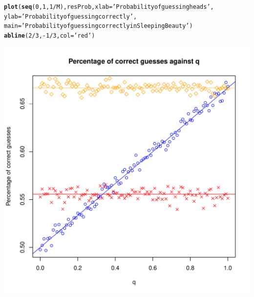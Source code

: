\documentclass{article}\usepackage[]{graphicx}\usepackage[]{color}
\makeatletter
\def\maxwidth{ %
  \ifdim\Gin@nat@width>\linewidth
    \linewidth
  \else
    \Gin@nat@width
  \fi
}
\newcommand{\hlnum}[1]{\textcolor[rgb]{0.686,0.059,0.569}{#1}}%
\newcommand{\hlstr}[1]{\textcolor[rgb]{0.192,0.494,0.8}{#1}}%
\newcommand{\hlopt}[1]{\textcolor[rgb]{0,0,0}{#1}}%
\newcommand{\hlstd}[1]{\textcolor[rgb]{0.345,0.345,0.345}{#1}}%
\newcommand{\hlkwc}[1]{\textcolor[rgb]{0.333,0.667,0.333}{#1}}%
\newcommand{\hlkwd}[1]{\textcolor[rgb]{0.737,0.353,0.396}{\textbf{#1}}}%
\newenvironment{kframe}{%
 \def\at@end@of@kframe{}%
 \ifinner\ifhmode%
  \def\at@end@of@kframe{\end{minipage}}%
  \begin{minipage}{\columnwidth}%
 \fi\fi%
 \def\FrameCommand##1{\hskip\@totalleftmargin \hskip-\fboxsep
 \colorbox{shadecolor}{##1}\hskip-\fboxsep
     \hskip-\linewidth \hskip-\@totalleftmargin \hskip\columnwidth}%
 \MakeFramed {\advance\hsize-\width
   \@totalleftmargin\z@ \linewidth\hsize
   \@setminipage}}%
 {\par\unskip\endMakeFramed%
 \at@end@of@kframe}
\newenvironment{knitrout}{}{} %
\makeatother
\begin{document}
\begin{knitrout}
\begin{kframe}
\begin{alltt}
\hlkwd{plot}\hlstd{(}\hlkwd{seq}\hlstd{(}\hlnum{0}\hlstd{,}\hlnum{1}\hlstd{,}\hlnum{1}\hlopt{/}\hlstd{M), resProb,} \hlkwc{xlab}\hlstd{=}\hlstr{'Probability of guessing heads'}\hlstd{,}
     \hlkwc{ylab}\hlstd{=}\hlstr{'Probability of guessing correctly'}\hlstd{,}
     \hlkwc{main}\hlstd{=}\hlstr{'Probability of guessing correctly in Sleeping Beauty'}\hlstd{)}
\hlkwd{abline}\hlstd{(}\hlnum{2}\hlopt{/}\hlnum{3}\hlstd{,}\hlopt{-}\hlnum{1}\hlopt{/}\hlnum{3}\hlstd{,} \hlkwc{col}\hlstd{=}\hlstr{'red'}\hlstd{)}
\end{alltt}
\end{kframe}
\includegraphics[width=\maxwidth]{figure/unnamed-chunk-1-1} 

\end{knitrout}
\end{document}
